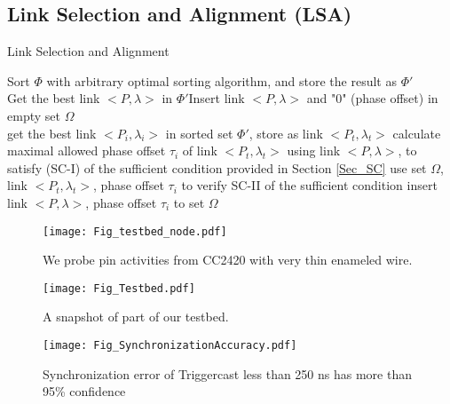 \documentclass[conference]{IEEEtran}
\begin{document}
\subsection{Link Selection and Alignment (LSA)}
\begin{algorithm}
\label{Alg_LSA}
\caption{Link Selection and Alignment} 
\SetAlgoNoLine  \LinesNumbered
{} 
\BlankLine
Sort $\Phi$ with arbitrary optimal sorting algorithm, and store the result as $\Phi'$ \\
Get the best link $<P,\lambda>$ in $\Phi'$Insert link $<P,\lambda>$ and "0" (phase offset) in empty set $\Omega$\\
{{get the best link $<P_i,\lambda_i>$ in sorted set $\Phi'$, store as link $<P_t,\lambda_t>$}\;
{calculate maximal allowed phase offset $\tau_i$ of link $<P_t,\lambda_t>$ using link $<P,\lambda>$, to satisfy (SC-I) of the sufficient condition provided in Section \ref{Sec_SC}}\;
{use set $\Omega$, link $<P_t,\lambda_t>$, phase offset $\tau_i$ to verify SC-II of the sufficient condition}\;
{{insert link $<P,\lambda>$, phase offset $\tau_i$ to set $\Omega$}\;
}}
\end{algorithm}
\begin{figure*}[t]
  \centering
\begin{minipage}[b]{0.32\textwidth}
    \centering
    \texttt{[image: Fig\_testbed\_node.pdf]}
    \caption{We probe pin activities from CC2420 with very thin enameled wire.}
    \label{Fig_testbed_node}\end{minipage}\hspace{0.01\textwidth}\begin{minipage}[b]{0.32\textwidth}
    \centering
    \texttt{[image: Fig\_Testbed.pdf]}
    \caption{A snapshot of part of our testbed.}
    \label{Fig_Testbed}\end{minipage}\hspace{0.01\textwidth}\begin{minipage}[b]{0.32\textwidth}
    \centering
    \texttt{[image: Fig\_SynchronizationAccuracy.pdf]}
    \caption{Synchronization error of Triggercast less than 250 ns has more than 95\% confidence}
    \label{Fig_SynchronizationAccuracy}\end{minipage}\end{figure*}
\end{document}
